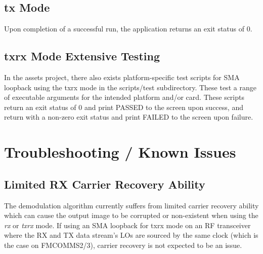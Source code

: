   \subsection{tx Mode}
    Upon completion of a successful run, the application returns an exit status of
  0.

  \subsection{txrx Mode Extensive Testing}
    In the assets project, there also exists platform-specific test scripts for
    SMA loopback using the txrx mode in
    the scripts/test subdirectory. These test a range of executable arguments
    for the intended platform and/or card. These scripts return an exit
    status of 0 and print PASSED to the screen upon success, and return
    with a non-zero exit status and print FAILED to the screen upon failure.

\pagebreak

\section{Troubleshooting / Known Issues}

  \subsection{Limited RX Carrier Recovery Ability} %

    The demodulation algorithm currently suffers from limited carrier
    recovery ability which can cause the output image to be corrupted or
    non-existent
    when using the \textit{rx} or \textit{txrx} mode.
    If using an SMA loopback for txrx mode
    on an RF transceiver where the RX and TX data stream's LOs are sourced by
    the same clock (which is the case on FMCOMMS2/3), carrier recovery is not
    expected to be an issue.

